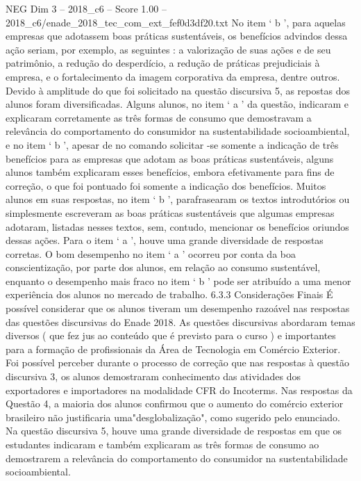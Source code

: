 \begin{textsample}{NEG Dim 3 – 2018\_c6 – Score 1.00 – 2018\_c6/enade\_2018\_tec\_com\_ext\_fef0d3df20.txt}
No item ‘ b ’, para aquelas empresas que adotassem boas práticas sustentáveis, os benefícios advindos dessa ação seriam, por exemplo, as seguintes : a valorização de suas ações e de seu patrimônio, a redução do desperdício, a redução de práticas prejudiciais à empresa, e o fortalecimento da imagem corporativa da empresa, dentre outros.
Devido à amplitude do que foi solicitado na questão discursiva 5, as repostas dos alunos foram diversificadas.
Alguns alunos, no item ‘ a ’ da questão, indicaram e explicaram corretamente as três formas de consumo que demostravam a relevância do comportamento do consumidor na sustentabilidade socioambiental, e no item ‘ b ’, apesar de no comando solicitar -se somente a indicação de três benefícios para as empresas que adotam as boas práticas sustentáveis, alguns alunos também explicaram esses benefícios, embora efetivamente para fins de correção, o que foi pontuado foi somente a indicação dos benefícios.
Muitos alunos em suas respostas, no item ‘ b ’, parafrasearam os textos introdutórios ou simplesmente escreveram as boas práticas sustentáveis que algumas empresas adotaram, listadas nesses textos, sem, contudo, mencionar os benefícios oriundos dessas ações.
Para o item ‘ a ’, houve uma grande diversidade de respostas corretas.
O bom desempenho no item ‘ a ’ ocorreu por conta da boa conscientização, por parte dos alunos, em relação ao consumo sustentável, enquanto o desempenho mais fraco no item ‘ b ’ pode ser atribuído a uma menor experiência dos alunos no mercado de trabalho. 6.3.3 Considerações Finais É possível considerar que os alunos tiveram um desempenho razoável nas respostas das questões discursivas do Enade 2018.
As questões discursivas abordaram temas diversos ( que fez jus ao conteúdo que é previsto para o curso ) e importantes para a formação de profissionais da Área de Tecnologia em Comércio Exterior.
Foi possível perceber durante o processo de correção que nas respostas à questão discursiva 3, os alunos demostraram conhecimento das atividades dos exportadores e importadores na modalidade CFR do Incoterms.
Nas respostas da Questão 4, a maioria dos alunos confirmou que o aumento do comércio exterior brasileiro não justificaria uma"desglobalização", como sugerido pelo enunciado.
Na questão discursiva 5, houve uma grande diversidade de respostas em que os estudantes indicaram e também explicaram as três formas de consumo ao demostrarem a relevância do comportamento do consumidor na sustentabilidade socioambiental.

\end{textsample}
